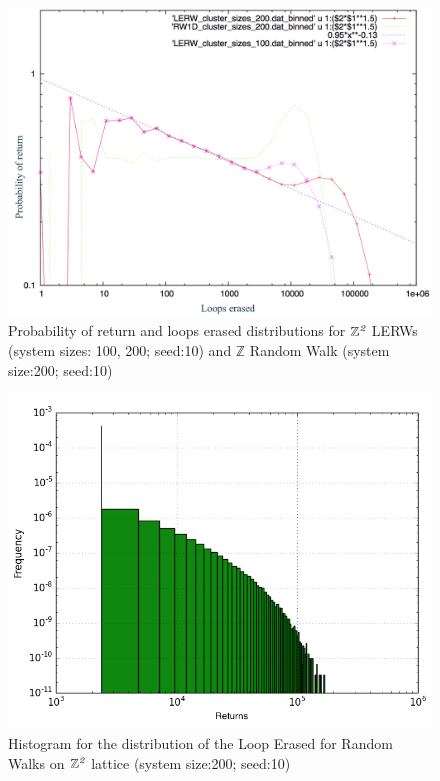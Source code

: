 \documentclass{article}
\begin{document}
\begin{figure}[H]
	\centering
		\includegraphics[scale=0.6]{preturn_le_plot}
		\caption{Probability of return and loops erased distributions for $\mathbb{Z}^{\emph{2}}$ LERWs (system sizes: 100, 200; seed:10) and $\mathbb{Z}$ Random Walk (system size:200; seed:10)}
		\label{fig:AREr}
\end{figure}
\begin{figure}[H]
	\centering
		\includegraphics[scale=0.5]{LERW_cluster_sizes_200_histogram}
		\caption{Histogram for the distribution of the Loop Erased for Random Walks on $\mathbb{Z}^{\emph{2}}$ lattice (system size:200; seed:10)}
		\label{fig:LERWhdish}
\end{figure}
\end{document}
